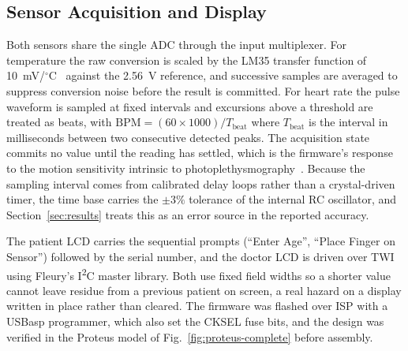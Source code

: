 \subsection{Sensor Acquisition and Display}
Both sensors share the single ADC through the input multiplexer. For temperature the raw conversion
is scaled by the LM35 transfer function of 10~mV/$^{\circ}$C~\cite{ti2022} against the 2.56~V
reference, and successive samples are averaged to suppress conversion noise before the result is
committed. For heart rate the pulse waveform is sampled at fixed intervals and excursions above a
threshold are treated as beats, with $\text{BPM} = (60 \times 1000)/T_{\text{beat}}$ where
$T_{\text{beat}}$ is the interval in milliseconds between two consecutive detected peaks. The
acquisition state commits no value until the reading has settled, which is the firmware's response to
the motion sensitivity intrinsic to photoplethysmography~\cite{allen2007ppg}. Because the sampling
interval comes from calibrated delay loops rather than a crystal-driven timer, the time base carries
the $\pm 3\%$ tolerance of the internal RC oscillator, and Section~\ref{sec:results} treats this as
an error source in the reported accuracy.

The patient LCD carries the sequential prompts (``Enter Age'', ``Place Finger on Sensor'') followed by
the serial number, and the doctor LCD is driven over TWI using Fleury's I\textsuperscript{2}C master
library. Both use fixed field widths so a shorter value cannot leave residue from a previous patient
on screen, a real hazard on a display written in place rather than cleared. The firmware was flashed
over ISP with a USBasp programmer, which also set the CKSEL fuse bits, and the design was verified in
the Proteus model of Fig.~\ref{fig:proteus-complete} before assembly.
